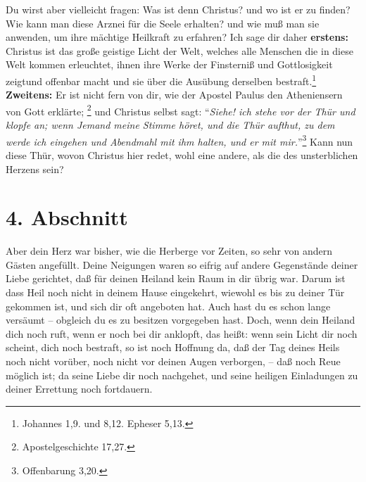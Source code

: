Du wirst aber vielleicht fragen: Was ist denn Christus? und wo ist er zu finden?
Wie kann man diese Arznei für die Seele erhalten? und wie muß man sie anwenden,
um ihre mächtige Heilkraft zu erfahren? Ich sage dir daher \textbf{erstens:}
Christus ist das große geistige Licht der Welt, welches alle Menschen die in
diese Welt kommen erleuchtet, ihnen ihre Werke der Finsterniß und Gottlosigkeit
zeigtund offenbar macht und sie über die Ausübung derselben bestraft.\footnote{Johannes 1,9. und 8,12. Epheser 5,13.}
 
\textbf{Zweitens:} Er ist nicht fern von dir, wie der
Apostel Paulus den Atheniensern von Gott erklärte;
\footnote{Apostelgeschichte 17,27.} 
und Christus selbst sagt: "`\textit{Siehe! ich stehe vor der Thür und klopfe an;
wenn Jemand meine Stimme höret, und die Thür aufthut, zu dem werde ich eingehen
und Abendmahl mit ihm halten, und er mit mir.}"'\footnote{Offenbarung 3,20.}
Kann 
nun diese Thür, wovon Christus hier redet, wohl eine andere, als die des
unsterblichen Herzens sein?

\section{4. Abschnitt}  \label{kap2_ab4}

Aber dein Herz war bisher, wie die Herberge vor Zeiten, so sehr von andern
Gästen angefüllt. Deine Neigungen waren so eifrig auf andere Gegenstände deiner
Liebe gerichtet, daß für deinen Heiland kein Raum in dir übrig war. Darum ist
dass Heil noch nicht in deinem Hause eingekehrt, wiewohl es bis zu deiner Tür
gekommen ist, und sich dir oft angeboten hat. Auch hast du es schon lange
versäumt -- obgleich du es zu besitzen vorgegeben hast. Doch, wenn dein Heiland
dich noch ruft, wenn er noch bei dir anklopft, das heißt: wenn sein Licht dir
noch scheint, dich noch bestraft, so ist noch Hoffnung da, daß der Tag deines
Heils noch nicht vorüber, noch nicht vor deinen Augen verborgen, -- daß noch Reue
möglich ist; da seine Liebe dir noch nachgehet, und seine heiligen Einladungen
zu deiner Errettung noch fortdauern.

